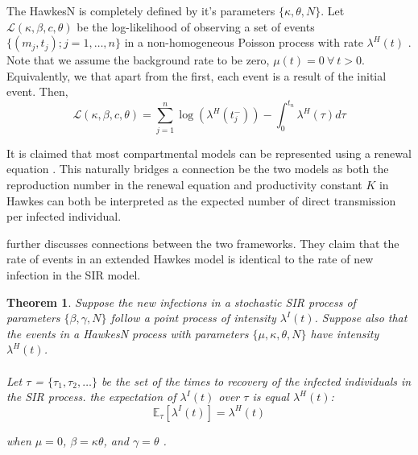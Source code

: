 \documentclass[12pt]{article}
\newtheorem{theorem}{Theorem}
\begin{document}
The HawkesN is completely defined by it's parameters $\{\kappa, \theta, N \}$. Let $\mathcal{L}(\kappa, \beta, c, \theta)$ be the log-likelihood of observing a set of events $\{(m_j, t_j); j = 1, \ldots, n\}$ in a non-homogeneous Poisson process with rate $\lambda^H(t)$ \cite{Rizoiu2018}. Note that we assume the background rate to be zero, $\mu(t) = 0 \ \forall\ t>0$. Equivalently, we that apart from the first, each event is a result of the initial event. Then,
$$
\mathcal{L}(\kappa, \beta, c, \theta) = \sum_{j=1}^n \log (\lambda^H (t_j^-)) - \int_0^{t_n} \lambda^H (\tau) d \tau
$$


It is claimed that most compartmental models can be represented using a renewal equation \cite{Kresin2022}. This naturally bridges a connection be the two models as both the reproduction number in the renewal equation and productivity constant $K$ in Hawkes can both be interpreted as the expected number of direct transmission per infected individual.


\cite{Rizoiu2018} further discusses connections between the two frameworks. They claim that the rate of events in an extended Hawkes model is identical to the rate of new infection in the SIR model. 
\\

\begin{theorem}
Suppose the new infections in a stochastic SIR process of parameters $\{\beta, \gamma, N\}$ follow a point process of intensity $\lambda^I(t)$. Suppose also that the events in a HawkesN process with parameters $\{\mu, \kappa, \theta, N\}$ have intensity $\lambda^H (t)$. 
\\
\\
Let $\tau$ = $\{\tau_1, \tau_2, \ldots \}$ be the set of the times to recovery of the infected individuals in the SIR process. the expectation of $\lambda^I (t)$ over $\tau$ is equal $\lambda^H (t)$:
$$
\mathbb{E}_\tau [ \lambda^I (t)] = \lambda^H (t)$$

when $\mu = 0$, $\beta = \kappa \theta$, and $\gamma = \theta$ \cite{Rizoiu2018}. 
\end{theorem}
\end{document}
